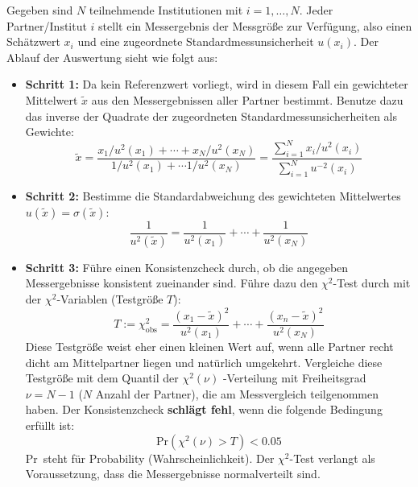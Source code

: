 Gegeben sind $N$ teilnehmende Institutionen mit $i=1,\dots,N$. Jeder
Partner/Institut $i$ stellt ein Messergebnis der Messgröße zur Verfügung, also einen Schätzwert $x_i$ und eine zugeordnete Standardmessunsicherheit
$u(x_i)$.
Der Ablauf der Auswertung sieht wie folgt aus:
\begin{itemize}
\item \textbf{Schritt 1:}  \newline
Da kein Referenzwert vorliegt, wird in diesem Fall ein gewichteter Mittelwert $\tilde x$ aus den Messergebnissen aller Partner bestimmt. Benutze dazu das inverse der Quadrate der zugeordneten Standardmessunsicherheiten als Gewichte:
\begin{equation}
\tilde x = \frac{x_1/u^2(x_1)+ \cdots + x_N/u^2(x_N)}{1/u^2(x_1)+ \cdots 1/u^2(x_N)} = \frac{\sum\limits_{i=1}^{N} x_i / u^2(x_i)}
{\sum\limits_{i=1}^{N} u^{-2}(x_i)}
\label{eq:referenzgleichepartner}
\end{equation}
\item \textbf{Schritt 2:}  \newline
Bestimme die Standardabweichung des gewichteten Mittelwertes $u(\tilde x)=\sigma(\tilde x)$:
\begin{equation}
\frac{1}{u^2(\tilde x)} = \frac{1}{u^2(x_1)} +\cdots + \frac{1}{u^2(x_N)}
\label{eq:Standardabweichung_Mittelwert}
\end{equation}
\item \textbf{Schritt 3:}  \newline
Führe einen Konsistenzcheck durch, ob die angegeben Messergebnisse
konsistent zueinander sind. Führe dazu den $\chi^2$-Test
durch mit der $\chi^2$-Variablen (Testgröße $T$):
\begin{equation}
T := \chi^2_\mathrm{obs} = \frac{(x_1 - \tilde x)^2}{u^2(x_1)} + \cdots +
\frac{(x_n-\tilde x)^2}{u^2(x_N)}
\label{eq:T_for_consistencecheck}
\end{equation}
Diese Testgröße weist eher einen kleinen Wert auf, wenn alle Partner
recht dicht am Mittelpartner liegen und natürlich umgekehrt.
Vergleiche diese Testgröße mit dem Quantil der $\chi^2 (\nu)$ -Verteilung
mit Freiheitsgrad $\nu = N-1$ ($N$ Anzahl der Partner),
die am Messvergleich teilgenommen haben.
Der Konsistenzcheck \textbf{schlägt fehl}, wenn die folgende Bedingung
erfüllt ist:
\begin{equation}
\mathrm{Pr}\left(\chi^2(\nu) > T\right) < 0.05
\label{eq:consistencecheck}
\end{equation}
\glqq Pr\grqq~steht für \glqq Probability (Wahrscheinlichkeit)\grqq.
Der $\chi^2$-Test verlangt als Voraussetzung, dass die Messergebnisse
normalverteilt sind.


\end{itemize}
